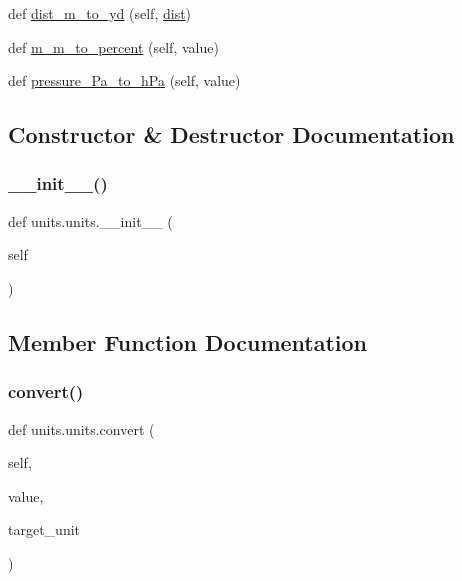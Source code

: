 \begin{DoxyCompactItemize}
\item 
def \hyperlink{classunits_1_1units_a9b2dea593e393a0a66420f4e4596ac1b}{dist\+\_\+m\+\_\+to\+\_\+yd} (self, \hyperlink{namespaceunits_ab66c7acd86085e0dd596e5835d5f020a}{dist})
\item 
def \hyperlink{classunits_1_1units_a981725c0877d96a44b774cc44e9a5cb0}{m\+\_\+m\+\_\+to\+\_\+percent} (self, value)
\item 
def \hyperlink{classunits_1_1units_a2f4c5ca2d50b1df9bb0526a908b351dc}{pressure\+\_\+\+Pa\+\_\+to\+\_\+h\+Pa} (self, value)
\end{DoxyCompactItemize}


\subsection{Constructor \& Destructor Documentation}
\mbox{\label{classunits_1_1units_a5127edbff09fdefbbd817b8fe069e3c9}} 
\subsubsection{\texorpdfstring{\+\_\+\+\_\+init\+\_\+\+\_\+()}{\_\_init\_\_()}}
{\footnotesize\ttfamily def units.\+units.\+\_\+\+\_\+init\+\_\+\+\_\+ (\begin{DoxyParamCaption}\item[{}]{self }\end{DoxyParamCaption})}



\subsection{Member Function Documentation}
\mbox{\label{classunits_1_1units_a9c3f8fdf21305ae05a38649233549925}} 
\subsubsection{\texorpdfstring{convert()}{convert()}}
{\footnotesize\ttfamily def units.\+units.\+convert (\begin{DoxyParamCaption}\item[{}]{self,  }\item[{}]{value,  }\item[{}]{target\+\_\+unit }\end{DoxyParamCaption})}

